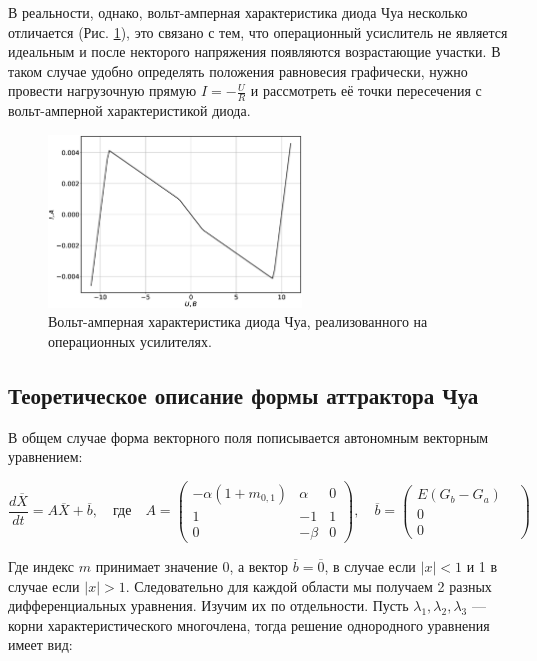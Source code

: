 \documentclass[12pt]{article}
\begin{document}
В реальности, однако, вольт-амперная характеристика диода Чуа несколько отличается (Рис. \ref{fig:VAC}), это
связано с тем, что операционный усислитель не является идеальным и после некторого напряжения появляются возрастающие участки.
В таком случае удобно определять положения равновесия графически, нужно провести нагрузочную прямую $I = -\frac{U}{R}$ и рассмотреть
её точки пересечения с вольт-амперной характеристикой диода.
\begin{figure}[H]
	\centering
	\includegraphics[width=0.6\textwidth]{VAC.eps}
	\caption{Вольт-амперная характеристика диода Чуа, реализованного на операционных усилителях.}
	\label{fig:VAC}
\end{figure}


\subsection*{Теоретическое описание формы аттрактора Чуа}

В общем случае форма векторного поля пописывается  автономным векторным уравнением:

\begin{equation}
	\frac{d\overline{X}}{dt} = A\overline{X} + \overline{b}, \quad \textit{где}
	\quad A=
	\begin{pmatrix}
		-\alpha(1+m_{0, 1}) & \alpha & 0 \\
		1                   & -1     & 1 \\
		0                   & -\beta & 0
	\end{pmatrix},
	\quad \overline{b} =
	\begin{pmatrix}
		E(G_b - G_a) \\
		0 &          \\
		0 &
	\end{pmatrix}
\end{equation}


Где индекс $m$ принимает значение 0, а вектор $\overline{b}=\overline{0}$, 
в случае если $|x| < 1$ и 1 в случае если  $|x| > 1$. 
Следовательно для каждой области мы получаем 2 разных дифференциальных уравнения. 
Изучим их по отдельности. Пусть $\lambda_1, \lambda_2, \lambda_3$ --- корни характеристического многочлена, 
тогда решение однородного уравнения имеет вид:
\end{document}

